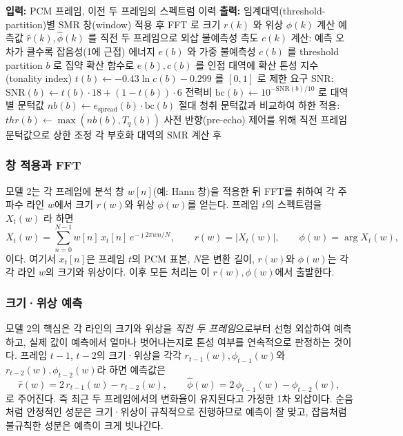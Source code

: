 \documentclass[11pt,a4paper]{article}
\newcommand{\dB}{\ensuremath{\,\mathrm{dB}}}          %
\newcommand{\ATH}{T_{q}}                               %
\newcommand{\SMR}{\mathrm{SMR}}                        %
\begin{document}
\begin{algorithm}[htbp]
  \caption{MPEG-1 심리음향 모델 2 (핵심)}
  \label{alg:pam2}
  \begin{algorithmic}[1]
    \State \textbf{입력:} PCM 프레임, 이전 두 프레임의 스펙트럼 이력
    \State \textbf{출력:} 임계대역(threshold-partition)별 $\SMR$
    \State 창(window) 적용 후 FFT 로 크기 $r(k)$ 와 위상 $\phi(k)$ 계산
    \State 예측값 $\hat r(k), \hat\phi(k)$ 를 직전 두 프레임으로 외삽
    \State 불예측성 측도 $c(k)$ 계산: 예측 오차가 클수록 잡음성(1에 근접)
    \State 에너지 $e(b)$ 와 가중 불예측성 $c(b)$ 를 threshold partition $b$ 로 집약
    \State 확산 함수로 $e(b), c(b)$ 를 인접 대역에 확산
    \State 톤성 지수(tonality index) $t(b) \gets -0.43\ln c(b) - 0.299$ 를 $[0,1]$ 로 제한
    \State 요구 SNR: $\mathrm{SNR}(b) \gets t(b)\cdot 18 + (1 - t(b))\cdot 6$ \Comment{\dB, 톤성일수록 큰 값}
    \State 전력비 $\mathrm{bc}(b) \gets 10^{-\mathrm{SNR}(b)/10}$ 로 대역별 문턱값 $\mathit{nb}(b) \gets e_{\text{spread}}(b)\cdot \mathrm{bc}(b)$
    \State 절대 청취 문턱값과 비교하여 하한 적용: $\mathit{thr}(b) \gets \max(\mathit{nb}(b), \ATH(b))$
    \State 사전 반향(pre-echo) 제어를 위해 직전 프레임 문턱값으로 상한 조정
    \State 각 부호화 대역의 $\SMR$ 계산 후 \Return
  \end{algorithmic}
\end{algorithm}

\subsubsection{창 적용과 FFT}
모델 2는 각 프레임에 분석 창 $w[n]$(예: Hann 창)을 적용한 뒤 FFT를 취하여 각 주파수
라인 $w$에서 크기 $r(w)$와 위상 $\phi(w)$를 얻는다. 프레임 $t$의 스펙트럼을 $X_t(w)$
라 하면
\begin{equation}\label{eq:pam2fft}
  X_t(w) = \sum_{n=0}^{N-1} w[n]\,x_t[n]\,e^{-\jmath 2\pi w n / N},
  \qquad
  r(w) = \lvert X_t(w)\rvert,
  \qquad
  \phi(w) = \arg X_t(w),
\end{equation}
이다. 여기서 $x_t[n]$은 프레임 $t$의 PCM 표본, $N$은 변환 길이, $r(w)$와 $\phi(w)$는
각각 라인 $w$의 크기와 위상이다. 이후 모든 처리는 이 $r(w), \phi(w)$에서 출발한다.

\subsubsection{크기·위상 예측}
모델 2의 핵심은 각 라인의 크기와 위상을 \emph{직전 두 프레임}으로부터 선형 외삽하여
예측하고, 실제 값이 예측에서 얼마나 벗어나는지로 톤성 여부를 연속적으로 판정하는
것이다. 프레임 $t-1$, $t-2$의 크기·위상을 각각 $r_{t-1}(w), \phi_{t-1}(w)$와
$r_{t-2}(w), \phi_{t-2}(w)$라 하면 예측값은
\begin{equation}\label{eq:pam2pred}
  \hat r(w) = 2\,r_{t-1}(w) - r_{t-2}(w),
  \qquad
  \hat\phi(w) = 2\,\phi_{t-1}(w) - \phi_{t-2}(w),
\end{equation}
로 주어진다. 즉 최근 두 프레임에서의 변화율이 유지된다고 가정한 1차 외삽이다.
순음처럼 안정적인 성분은 크기·위상이 규칙적으로 진행하므로 예측이 잘 맞고,
잡음처럼 불규칙한 성분은 예측이 크게 빗나간다.
\end{document}
